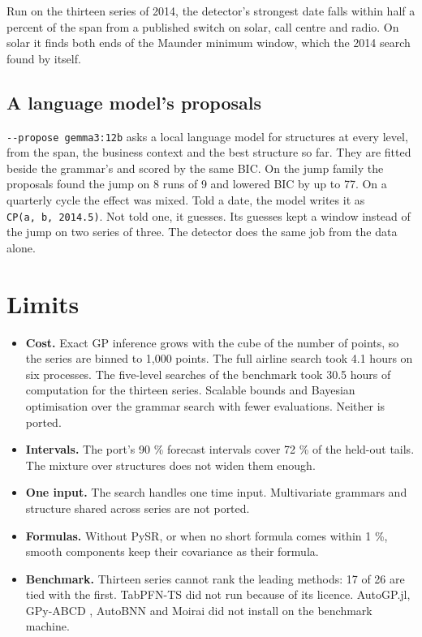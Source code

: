 \documentclass[
]{article}
\providecommand{\tightlist}{%
  \setlength{\itemsep}{0pt}\setlength{\parskip}{0pt}}
\begin{document}
Run on the thirteen series of 2014, the detector's strongest date falls
within half a percent of the span from a published switch on solar, call
centre and radio. On solar it finds both ends of the Maunder minimum
window, which the 2014 search found by itself.

\subsection{A language model's
proposals}\label{a-language-models-proposals}

\texttt{-\/-propose\ gemma3:12b} asks a local language model for
structures at every level, from the span, the business context and the
best structure so far. They are fitted beside the grammar's and scored
by the same BIC. On the jump family the proposals found the jump on 8
runs of 9 and lowered BIC by up to 77. On a quarterly cycle the effect
was mixed. Told a date, the model writes it as
\texttt{CP(a,\ b,\ 2014.5)}. Not told one, it guesses. Its guesses kept
a window instead of the jump on two series of three. The detector does
the same job from the data alone.

\section{Limits}\label{limits}

\begin{itemize}
\tightlist
\item
  \textbf{Cost.} Exact GP inference grows with the cube of the number of
  points, so the series are binned to 1,000 points. The full airline
  search took 4.1 hours on six processes. The five-level searches of the
  benchmark took 30.5 hours of computation for the thirteen series.
  Scalable bounds \autocite{kim2018scaling} and Bayesian optimisation
  over the grammar \autocite{malkomes2016bayesian,bitzer2022structural}
  search with fewer evaluations. Neither is ported.
\item
  \textbf{Intervals.} The port's 90 \% forecast intervals cover 72 \% of
  the held-out tails. The mixture over structures does not widen them
  enough.
\item
  \textbf{One input.} The search handles one time input. Multivariate
  grammars \autocite{duvenaud2011additive} and structure shared across
  series \autocite{hwang2016relational} are not ported.
\item
  \textbf{Formulas.} Without PySR, or when no short formula comes within
  1 \%, smooth components keep their covariance as their formula.
\item
  \textbf{Benchmark.} Thirteen series cannot rank the leading methods:
  17 of 26 are tied with the first. TabPFN-TS \autocite{hoo2025tabpfnts}
  did not run because of its licence. AutoGP.jl, GPy-ABCD
  \autocite{fletcher2021gpyabcd}, AutoBNN \autocite{koster2024autobnn}
  and Moirai \autocite{woo2024moirai} did not install on the benchmark
  machine.
\end{itemize}
\end{document}

